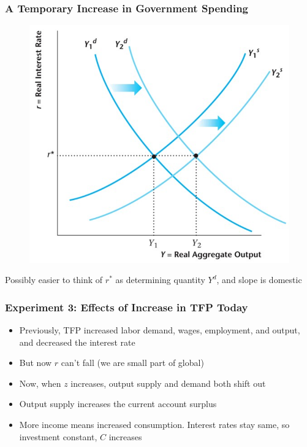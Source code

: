 \documentclass{beamer}
\begin{document}
\begin{frame}
\frametitle[alignment=center]{A Temporary Increase in Government Spending}
\begin{figure}
\centering
\includegraphics[scale=0.55]{Figures/W_Fig_16pt9.png}
\end{figure}
Possibly easier to think of $r^*$ as determining quantity $Y^d$, and slope is domestic
\end{frame}



\begin{frame}
\frametitle[alignment=center]{Experiment 3: Effects of Increase in TFP Today}
\begin{itemize}
\item Previously, TFP increased labor demand, wages, employment, and output, and decreased the interest rate
\bigskip
\item But now $r$ can't fall (we are small part of global)
\bigskip
\item Now, when $z$ increases, output supply and demand both shift out
\bigskip
\item Output supply increases the current account surplus
\bigskip
\item More income means increased consumption.  Interest rates stay same, so investment constant, $C$ increases
\end{itemize}
\end{frame}
\end{document}
